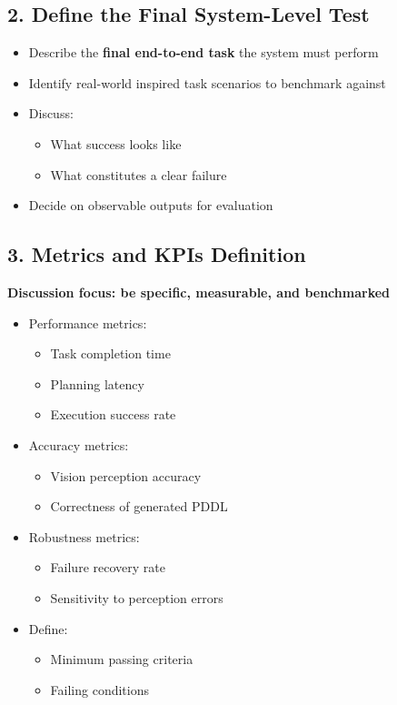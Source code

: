 \documentclass[12pt]{article}
\begin{document}
\subsection*{2. Define the Final System-Level Test}
\begin{itemize}
    \item Describe the \textbf{final end-to-end task} the system must perform
    \item Identify real-world inspired task scenarios to benchmark against
    \item Discuss:
    \begin{itemize}
        \item What success looks like
        \item What constitutes a clear failure
    \end{itemize}
    \item Decide on observable outputs for evaluation
\end{itemize}

\subsection*{3. Metrics and KPIs Definition}
\textbf{Discussion focus: be specific, measurable, and benchmarked}
\begin{itemize}
    \item Performance metrics:
    \begin{itemize}
        \item Task completion time
        \item Planning latency
        \item Execution success rate
    \end{itemize}
    \item Accuracy metrics:
    \begin{itemize}
        \item Vision perception accuracy
        \item Correctness of generated PDDL
    \end{itemize}
    \item Robustness metrics:
    \begin{itemize}
        \item Failure recovery rate
        \item Sensitivity to perception errors
    \end{itemize}
    \item Define:
    \begin{itemize}
        \item Minimum passing criteria
        \item Failing conditions
    \end{itemize}
\end{itemize}
\end{document}
